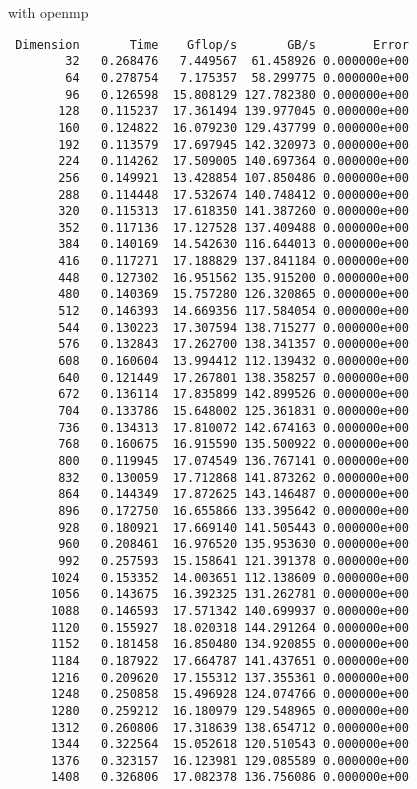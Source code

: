 \documentclass{article}
\begin{document}
with openmp
\begin{verbatim}
 Dimension       Time    Gflop/s       GB/s        Error
        32   0.268476   7.449567  61.458926 0.000000e+00
        64   0.278754   7.175357  58.299775 0.000000e+00
        96   0.126598  15.808129 127.782380 0.000000e+00
       128   0.115237  17.361494 139.977045 0.000000e+00
       160   0.124822  16.079230 129.437799 0.000000e+00
       192   0.113579  17.697945 142.320973 0.000000e+00
       224   0.114262  17.509005 140.697364 0.000000e+00
       256   0.149921  13.428854 107.850486 0.000000e+00
       288   0.114448  17.532674 140.748412 0.000000e+00
       320   0.115313  17.618350 141.387260 0.000000e+00
       352   0.117136  17.127528 137.409488 0.000000e+00
       384   0.140169  14.542630 116.644013 0.000000e+00
       416   0.117271  17.188829 137.841184 0.000000e+00
       448   0.127302  16.951562 135.915200 0.000000e+00
       480   0.140369  15.757280 126.320865 0.000000e+00
       512   0.146393  14.669356 117.584054 0.000000e+00
       544   0.130223  17.307594 138.715277 0.000000e+00
       576   0.132843  17.262700 138.341357 0.000000e+00
       608   0.160604  13.994412 112.139432 0.000000e+00
       640   0.121449  17.267801 138.358257 0.000000e+00
       672   0.136114  17.835899 142.899526 0.000000e+00
       704   0.133786  15.648002 125.361831 0.000000e+00
       736   0.134313  17.810072 142.674163 0.000000e+00
       768   0.160675  16.915590 135.500922 0.000000e+00
       800   0.119945  17.074549 136.767141 0.000000e+00
       832   0.130059  17.712868 141.873262 0.000000e+00
       864   0.144349  17.872625 143.146487 0.000000e+00
       896   0.172750  16.655866 133.395642 0.000000e+00
       928   0.180921  17.669140 141.505443 0.000000e+00
       960   0.208461  16.976520 135.953630 0.000000e+00
       992   0.257593  15.158641 121.391378 0.000000e+00
      1024   0.153352  14.003651 112.138609 0.000000e+00
      1056   0.143675  16.392325 131.262781 0.000000e+00
      1088   0.146593  17.571342 140.699937 0.000000e+00
      1120   0.155927  18.020318 144.291264 0.000000e+00
      1152   0.181458  16.850480 134.920855 0.000000e+00
      1184   0.187922  17.664787 141.437651 0.000000e+00
      1216   0.209620  17.155312 137.355361 0.000000e+00
      1248   0.250858  15.496928 124.074766 0.000000e+00
      1280   0.259212  16.180979 129.548965 0.000000e+00
      1312   0.260806  17.318639 138.654712 0.000000e+00
      1344   0.322564  15.052618 120.510543 0.000000e+00
      1376   0.323157  16.123981 129.085589 0.000000e+00
      1408   0.326806  17.082378 136.756086 0.000000e+00

\end{verbatim}
\end{document}
